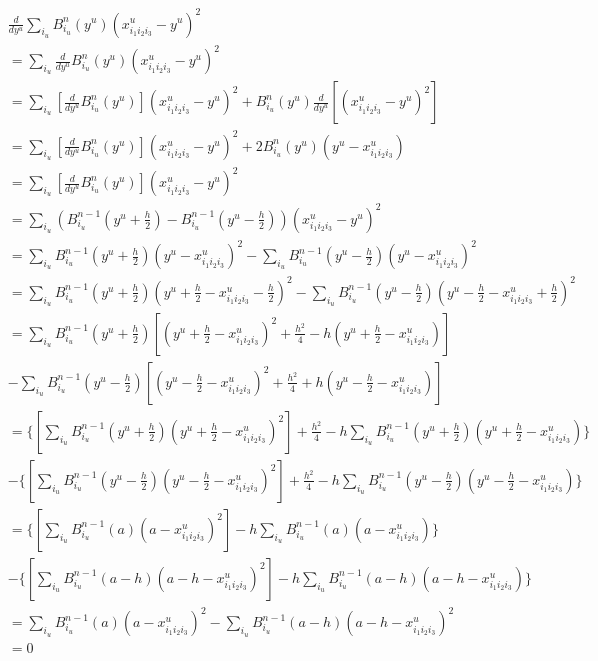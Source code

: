 {\small
\begin{equation}
    \begin{split}
        &\frac{d}{dy^u}\sum_{i_u} B_{i_u}^n(y^u) (x_{i_1 i_2 i_3}^u - y^u)^2\\ 
        &= \sum_{i_u} \frac{d}{dy^u} B_{i_u}^n(y^u) (x_{i_1 i_2 i_3}^u - y^u)^2\\
        &= \sum_{i_u} [\frac{d}{dy^u} B_{i_u}^n(y^u)] (x_{i_1 i_2 i_3}^u - y^u)^2 + B_{i_u}^n(y^u)\frac{d}{dy^u}[(x_{i_1 i_2 i_3}^u - y^u)^2]\\
        &= \sum_{i_u} [\frac{d}{dy^u} B_{i_u}^n(y^u)] (x_{i_1 i_2 i_3}^u - y^u)^2 + 2B_{i_u}^n(y^u)(y^u - x_{i_1i_2i_3}^u)\\
        &= \sum_{i_u} [\frac{d}{dy^u} B_{i_u}^n(y^u)] (x_{i_1 i_2 i_3}^u - y^u)^2\\
        &= \sum_{i_u} (B_{i_u}^{n-1}(y^u + \frac{h}{2}) - B_{i_u}^{n-1}(y^u - \frac{h}{2})) (x_{i_1 i_2 i_3}^u - y^u)^2\\
        &= \sum_{i_u} B_{i_u}^{n-1}(y^u + \frac{h}{2}) (y^u - x_{i_1 i_2 i_3}^u)^2 - \sum_{i_u}B_{i_u}^{n-1}(y^u - \frac{h}{2}) (y^u - x_{i_1 i_2 i_3}^u)^2\\   
        &= \sum_{i_u} B_{i_u}^{n-1}(y^u + \frac{h}{2}) (y^u + \frac{h}{2} - x_{i_1 i_2 i_3}^u - \frac{h}{2})^2 -  \sum_{i_u} B_{i_u}^{n-1}(y^u - \frac{h}{2}) (y^u - \frac{h}{2} - x_{i_1 i_2 i_3}^u + \frac{h}{2})^2\\   
        &= \sum_{i_u} B_{i_u}^{n-1}(y^u + \frac{h}{2}) [(y^u + \frac{h}{2} - x_{i_1 i_2 i_3}^u)^2 + \frac{h^2}{4} - h(y^u + \frac{h}{2} - x_{i_1 i_2 i_3}^u)] \\
        &- \sum_{i_u} B_{i_u}^{n-1}(y^u - \frac{h}{2}) [(y^u - \frac{h}{2} - x_{i_1 i_2 i_3}^u)^2 + \frac{h^2}{4} + h(y^u - \frac{h}{2} - x_{i_1 i_2 i_3}^u)]\\
        &= \{[\sum_{i_u} B_{i_u}^{n-1}(y^u + \frac{h}{2}) (y^u + \frac{h}{2} - x_{i_1 i_2 i_3}^u)^2] + \frac{h^2}{4} - h\sum_{i_u}B_{i_u}^{n-1}(y^u + \frac{h}{2})(y^u + \frac{h}{2} - x_{i_1 i_2 i_3}^u)\}\\
        &- \{[\sum_{i_u} B_{i_u}^{n-1}(y^u - \frac{h}{2}) (y^u - \frac{h}{2} - x_{i_1 i_2 i_3}^u)^2] + \frac{h^2}{4} - h\sum_{i_u}B_{i_u}^{n-1}(y^u - \frac{h}{2})(y^u - \frac{h}{2} - x_{i_1 i_2 i_3}^u)\}\\
        &= \{[\sum_{i_u} B_{i_u}^{n-1}(a) (a - x_{i_1 i_2 i_3}^u)^2]  - h\sum_{i_u}B_{i_u}^{n-1}(a)(a - x_{i_1 i_2 i_3}^u)\}\\
        &- \{[\sum_{i_u} B_{i_u}^{n-1}(a - h) (a - h - x_{i_1 i_2 i_3}^u)^2] - h\sum_{i_u}B_{i_u}^{n-1}(a - h)(a - h - x_{i_1 i_2 i_3}^u) \}\\
        &= \sum_{i_u} B_{i_u}^{n-1}(a) (a - x_{i_1 i_2 i_3}^u)^2 - \sum_{i_u} B_{i_u}^{n-1}(a - h) (a - h - x_{i_1 i_2 i_3}^u)^2\\
        &= 0 \\
    \end{split}
\end{equation}
}
